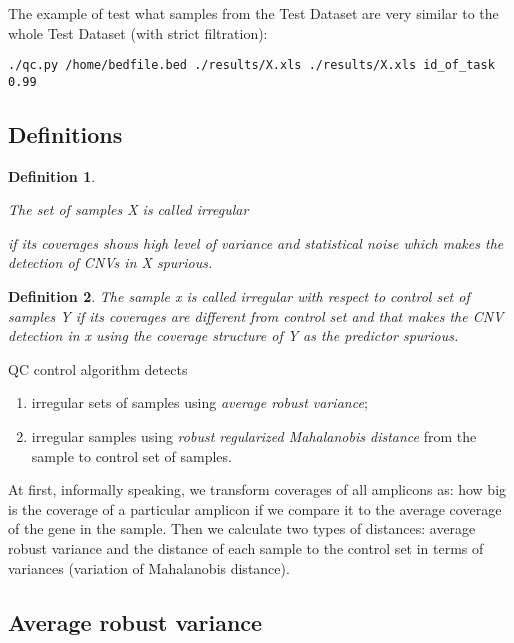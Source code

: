 \documentclass{article}
\newtheorem{mydef}{Definition}
\begin{document}
The example of \hypertarget{runWithStrictFiltration}{test what samples from the Test Dataset are very similar to the whole Test Dataset (with strict filtration):}

\begin{lstlisting}[style=DOS, caption={QC control to find samples from the Test Dataset that are similar to the Test Dataset}]
./qc.py /home/bedfile.bed ./results/X.xls ./results/X.xls id_of_task 0.99
\end{lstlisting}





\subsection{Definitions}

\begin{mydef}
\hypertarget{irregular}{The set of samples X is called irregular} if its coverages shows high level of variance and statistical noise which makes the detection of CNVs in X spurious.  
\end{mydef}

\begin{mydef}
 The sample x is called irregular with respect to control set of samples Y if its coverages are different from control set and that makes the CNV detection in x using the coverage structure of Y as the predictor spurious.  
\end{mydef}

QC control algorithm detects

\begin{enumerate}
\item irregular sets of samples using {\it average robust variance};
\item irregular samples using {\it robust regularized Mahalanobis distance} from the sample to control set of samples.
\end{enumerate}

At first, informally speaking, we transform coverages of all amplicons as: how big is the coverage of a particular amplicon if we compare it to the average coverage of the gene in the sample. Then we calculate two types of distances: average robust variance and the distance of each sample to the control set in terms of variances (variation of Mahalanobis distance).







\newpage
\subsection{Average robust variance}
\end{document}
